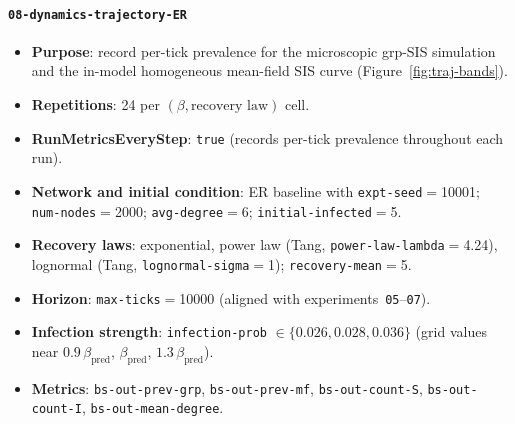 \documentclass[11pt,a4paper]{article}
\begin{document}
\paragraph{\texttt{08-dynamics-trajectory-ER}}
\begin{itemize}[leftmargin=*]
  \item \textbf{Purpose}: record per-tick prevalence for the microscopic grp-SIS simulation and the in-model homogeneous mean-field SIS curve (Figure~\ref{fig:traj-bands}).
  \item \textbf{Repetitions}: 24 per $(\beta,\text{recovery law})$ cell.
  \item \textbf{RunMetricsEveryStep}: \texttt{true} (records per-tick prevalence throughout each run).
  \item \textbf{Network and initial condition}: ER baseline with \texttt{expt-seed}$=$10001; \texttt{num-nodes}$=$2000; \texttt{avg-degree}$=$6; \texttt{initial-infected}$=$5.
  \item \textbf{Recovery laws}: exponential, power law (Tang, \texttt{power-law-lambda}$=$4.24), lognormal (Tang, \texttt{lognormal-sigma}$=$1); \texttt{recovery-mean}$=$5.
  \item \textbf{Horizon}: \texttt{max-ticks}$=$10000 (aligned with experiments~\texttt{05}--\texttt{07}).
  \item \textbf{Infection strength}: \texttt{infection-prob} $\in\{0.026,0.028,0.036\}$ (grid values near $0.9\,\beta_{\mathrm{pred}}$, $\beta_{\mathrm{pred}}$, $1.3\,\beta_{\mathrm{pred}}$).
  \item \textbf{Metrics}: \texttt{bs-out-prev-grp}, \texttt{bs-out-prev-mf}, \texttt{bs-out-count-S}, \texttt{bs-out-count-I}, \texttt{bs-out-mean-degree}.
\end{itemize}
\end{document}

